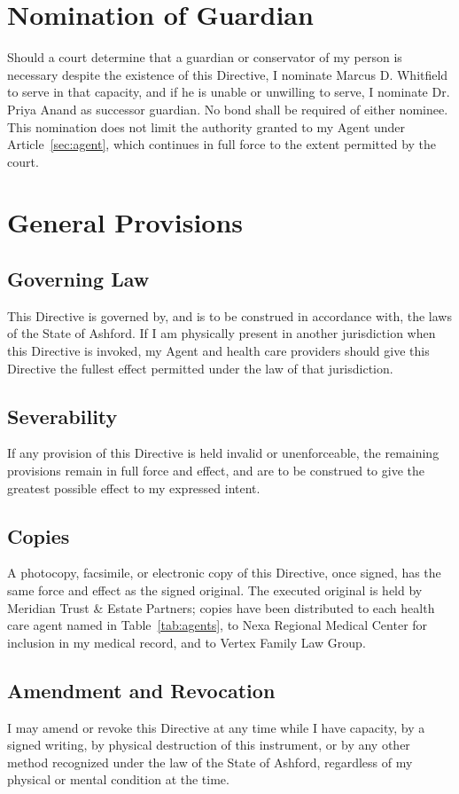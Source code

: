 \section{Nomination of Guardian}
\label{sec:guardian}

Should a court determine that a guardian or conservator of my person is necessary despite the existence of this Directive, I nominate Marcus D. Whitfield to serve in that capacity, and if he is unable or unwilling to serve, I nominate Dr. Priya Anand as successor guardian. No bond shall be required of either nominee. This nomination does not limit the authority granted to my Agent under Article~\ref{sec:agent}, which continues in full force to the extent permitted by the court.

\section{General Provisions}
\label{sec:general}

\subsection{Governing Law}
This Directive is governed by, and is to be construed in accordance with, the laws of the State of Ashford. If I am physically present in another jurisdiction when this Directive is invoked, my Agent and health care providers should give this Directive the fullest effect permitted under the law of that jurisdiction.

\subsection{Severability}
If any provision of this Directive is held invalid or unenforceable, the remaining provisions remain in full force and effect, and are to be construed to give the greatest possible effect to my expressed intent.

\subsection{Copies}
A photocopy, facsimile, or electronic copy of this Directive, once signed, has the same force and effect as the signed original. The executed original is held by Meridian Trust \& Estate Partners; copies have been distributed to each health care agent named in Table~\ref{tab:agents}, to Nexa Regional Medical Center for inclusion in my medical record, and to Vertex Family Law Group.

\subsection{Amendment and Revocation}
I may amend or revoke this Directive at any time while I have capacity, by a signed writing, by physical destruction of this instrument, or by any other method recognized under the law of the State of Ashford, regardless of my physical or mental condition at the time.
